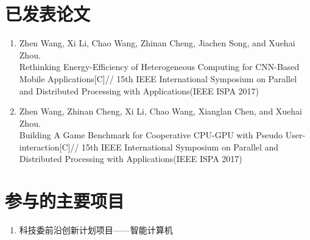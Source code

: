 \begin{publications}

\section*{已发表论文}

\begin{enumerate}
\item Zhen Wang, Xi Li, Chao Wang, Zhinan Cheng, Jiachen Song, and Xuehai Zhou.\\
Rethinking Energy-Efficiency of Heterogeneous Computing for CNN-Based Mobile Applications[C]//
15th IEEE International Symposium on Parallel and Distributed Processing with Applications(IEEE ISPA 2017)
\item Zhen Wang, Zhinan Cheng, Xi Li, Chao Wang, Xianglan Chen, and Xuehai Zhou.\\
Building A Game Benchmark for Cooperative CPU-GPU with Pseudo User-interaction[C]//
15th IEEE International Symposium on Parallel and Distributed Processing with Applications(IEEE ISPA 2017)
\end{enumerate}


\section*{参与的主要项目}
\begin{enumerate}
\item 科技委前沿创新计划项目——智能计算机
\end{enumerate}

\end{publications}
